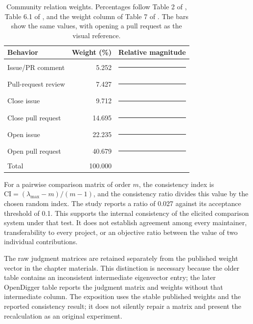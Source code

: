\begin{table}[tbp]
\caption{Community relation weights. Percentages follow Table 2 of \citet{zhao2024}, Table 6.1 of \citet{zhao2025thesis}, and the weight column of Table 7 of \citet{wang2026digger}. The bars show the same values, with opening a pull request as the visual reference.}
\label{tab:ch5-ahp}
\centering\small
\renewcommand{\arraystretch}{1.18}
\begin{tabularx}{\linewidth}{@{}Xr p{36mm}@{}}
\toprule
Behavior&Weight (\%)&Relative magnitude\\
\midrule
Issue/PR comment&5.252&\textcolor{FrameworkTeal!55}{\rule{4.52mm}{5pt}}\\
Pull-request review&7.427&\textcolor{FrameworkTeal!65}{\rule{6.39mm}{5pt}}\\
Close issue&9.712&\textcolor{FrameworkTeal!75}{\rule{8.36mm}{5pt}}\\
Close pull request&14.695&\textcolor{FrameworkTeal!85}{\rule{12.64mm}{5pt}}\\
Open issue&22.235&\textcolor{FrameworkTeal}{\rule{19.13mm}{5pt}}\\
Open pull request&40.679&\textcolor{FrameworkBlue}{\rule{35mm}{5pt}}\\
\midrule
Total&100.000&\\
\bottomrule
\end{tabularx}
\end{table}

For a pairwise comparison matrix of order \(m\), the consistency index is \(\mathrm{CI}=(\lambda_{\max}-m)/(m-1)\), and the consistency ratio divides this value by the chosen random index. The study reports a ratio of 0.027 against its acceptance threshold of 0.1. This supports the internal consistency of the elicited comparison system under that test. It does not establish agreement among every maintainer, transferability to every project, or an objective ratio between the value of two individual contributions.

The raw judgment matrices are retained separately from the published weight vector in the chapter materials. This distinction is necessary because the older table contains an inconsistent intermediate eigenvector entry; the later OpenDigger table reports the judgment matrix and weights without that intermediate column. The exposition uses the stable published weights and the reported consistency result; it does not silently repair a matrix and present the recalculation as an original experiment.

